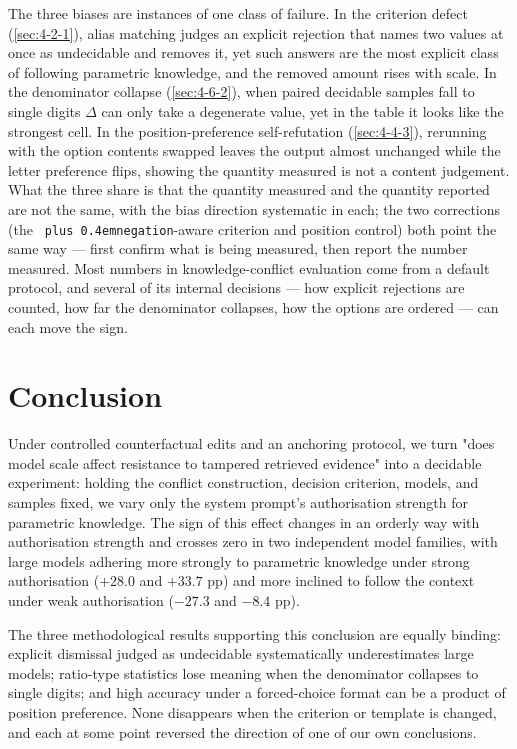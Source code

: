 \documentclass[pdflatex,sn-basic,Numbered]{sn-jnl}
\theoremstyle{thmstyleone}
\theoremstyle{thmstyletwo}
\theoremstyle{thmstylethree}
\DeclareRobustCommand{\code}[1]{\texttt{\spaceskip=0pt plus 0.4em\relax#1}}
\begin{document}
The three biases are instances of one class of failure. In the criterion defect (\ref{sec:4-2-1}), alias
matching judges an explicit rejection that names two values at once as undecidable and removes
it, yet such answers are the most explicit class of following parametric knowledge, and the
removed amount rises with scale. In the denominator collapse (\ref{sec:4-6-2}), when paired decidable
samples fall to single digits $\Delta$ can only take a degenerate value, yet in the table it
looks like the strongest cell. In the position-preference self-refutation (\ref{sec:4-4-3}), rerunning
with the option contents swapped leaves the output almost unchanged while the letter preference
flips, showing the quantity measured is not a content judgement. What the three share is that
the quantity measured and the quantity reported are not the same, with the bias direction
systematic in each; the two corrections (the \code{negation}-aware criterion and position control) both
point the same way — first confirm what is being measured, then report the number measured.
Most numbers in knowledge-conflict evaluation come from a default protocol, and several of its
internal decisions — how explicit rejections are counted, how far the denominator collapses,
how the options are ordered — can each move the sign.

\section{Conclusion}\label{sec:conc}

Under controlled counterfactual edits and an anchoring protocol, we turn "does model scale affect resistance to tampered retrieved evidence" into a decidable experiment: holding the conflict construction, decision criterion, models, and samples fixed, we vary only the system prompt's authorisation strength for parametric knowledge. The sign of this effect changes in an orderly way with authorisation strength and crosses zero in two independent model families, with large models adhering more strongly to parametric knowledge under strong authorisation ($+28.0$ and $+33.7$ pp) and more inclined to follow the context under weak authorisation ($-27.3$ and $-8.4$ pp).

The three methodological results supporting this conclusion are equally binding: explicit dismissal judged as undecidable systematically underestimates large models; ratio-type statistics lose meaning when the denominator collapses to single digits; and high accuracy under a forced-choice format can be a product of position preference. None disappears when the criterion or template is changed, and each at some point reversed the direction of one of our own conclusions.
\end{document}
